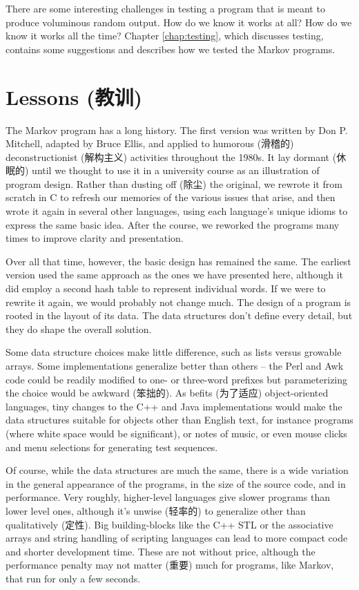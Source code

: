 There are some interesting challenges in testing a program that is meant to
produce voluminous random output. How do we know it works at all? How do we
know it works all the time? Chapter \ref{chap:testing}, which discusses
testing, contains some suggestions and describes how we tested the Markov
programs.

\section{Lessons (教训)}
\label{sec:lessons}

The Markov program has a long history. The first version was written by Don
P.  Mitchell, adapted by Bruce Ellis, and applied to humorous (滑稽的)
deconstructionist (解构主义) activities throughout the 1980s. It lay
dormant (休眠的) until we thought to use it in a university course as an
illustration of program design. Rather than dusting off (除尘) the
original, we rewrote it from scratch in C to refresh our memories of the
various issues that arise, and then wrote it again in several other
languages, using each language's unique idioms to express the same basic
idea. After the course, we reworked the programs many times to improve
clarity and presentation.

Over all that time, however, the basic design has remained the same. The
earliest version used the same approach as the ones we have presented here,
although it did employ a second hash table to represent individual words.
If we were to rewrite it again, we would probably not change much. The
design of a program is rooted in the layout of its data. The data
structures don't define every detail, but they do shape the overall
solution.

Some data structure choices make little difference, such as lists versus
growable arrays. Some implementations generalize better than others -- the
Perl and Awk code could be readily modified to one- or three-word prefixes
but parameterizing the choice would be awkward (笨拙的). As befits
(为了适应) object-oriented languages, tiny changes to the C++ and Java
implementations would make the data structures suitable for objects other
than English text, for instance programs (where white space would be
significant), or notes of music, or even mouse clicks and menu selections
for generating test sequences.

Of course, while the data structures are much the same, there is a wide
variation in the general appearance of the programs, in the size of the
source code, and in performance. Very roughly, higher-level languages give
slower programs than lower level ones, although it's unwise (轻率的) to
generalize other than qualitatively (定性). Big building-blocks like the
C++ STL or the associative arrays and string handling of scripting
languages can lead to more compact code and shorter development time. These
are not without price, although the performance penalty may not matter
(重要) much for programs, like Markov, that run for only a few seconds.

